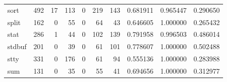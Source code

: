 \begin{tabular}{lrrrrrrrrr}
sort      &                                                492 &                                                 17 &                                                113 &                                                  0 &                                                219 &                                                143 &                                           0.681911 &                               0.965447 &                             0.290650 \\
split     &                                                162 &                                                  0 &                                                 55 &                                                  0 &                                                 64 &                                                 43 &                                           0.646605 &                               1.000000 &                             0.265432 \\
stat      &                                                286 &                                                  1 &                                                 44 &                                                  0 &                                                102 &                                                139 &                                           0.791958 &                               0.996503 &                             0.486014 \\
stdbuf    &                                                201 &                                                  0 &                                                 39 &                                                  0 &                                                 61 &                                                101 &                                           0.778607 &                               1.000000 &                             0.502488 \\
stty      &                                                331 &                                                  0 &                                                176 &                                                  0 &                                                 61 &                                                 94 &                                           0.555136 &                               1.000000 &                             0.283988 \\
sum       &                                                131 &                                                  0 &                                                 35 &                                                  0 &                                                 55 &                                                 41 &                                           0.694656 &                               1.000000 &                             0.312977 \\

\end{tabular}
